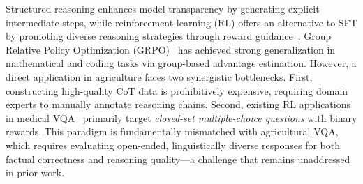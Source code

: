 \documentclass[11pt]{article}
\begin{document}
Structured reasoning enhances model transparency by generating explicit intermediate steps, while reinforcement learning (RL) offers an alternative to SFT by promoting diverse reasoning strategies through reward guidance~\cite{shakya2023reinforcement}. Group Relative Policy Optimization (GRPO)~\cite{shao2024deepseekmath,wang2025grpo,tong2025delving} has achieved strong generalization in mathematical and coding tasks via group-based advantage estimation. However, a direct application in agriculture faces two synergistic bottlenecks. First, constructing high-quality CoT data is prohibitively expensive, requiring domain experts to manually annotate reasoning chains. Second, existing RL applications in medical VQA~\cite{yi2022automated,hu2023reinforcement} primarily target \emph{closed-set multiple-choice questions} with binary rewards. 
This paradigm is fundamentally mismatched with agricultural VQA, which requires evaluating open-ended, linguistically diverse responses for both factual correctness and reasoning quality—a challenge that remains unaddressed in prior work.

\end{document}

